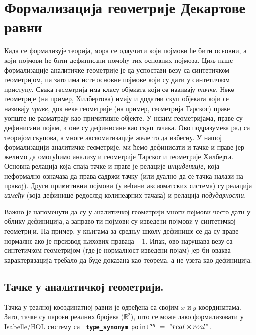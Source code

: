 \section{Формализација геометрије Декартове равни}
\label{sec:cartesian}

Када се формализује теорија, мора се одлучити који појмови ће бити
осно\-вни, а који појмови ће бити дефинисани помоћу тих основних
појмова. Циљ наше формализације аналитичке геометрије је да успостави
везу са си\-нте\-ти\-чком геометријом, па зато има исте основне
појмове који су дати у си\-нте\-ти\-чком приступу. Свака геометрија
има класу објеката који се називају \emph{тачке}. Неке геометрије (на
пример, Хилбертова) имају и додатни скуп објеката који се називају
\emph{праве}, док неке геометрије (на пример, геометрија Тарског)
праве уопште не разматрају као примитивне објекте.  У неким
геометријама, праве су дефинисани појам, и оне су дефинисане као скуп
тачака.  Ово подразумева рад са теоријом скупова, а многе
аксиоматизације желе то да избегну.  У нашој формализацији
ана\-ли\-ти\-чке геометрије, ми ћемо дефинисати и тачке и праве јер
желимо да омогућимо анализу и геометрије Тарског и геометрије
Хилберта. Основна релација која спаја тачке и праве је релације
\emph{инциденције}, која неформално означава да права садржи тачку
(или дуално да се тачка налази на правoj). Други примитивни појмови (у
већини аксиоматских система) су релација \emph{изме\-ђу} (која дефинише
редослед колинеарних тачака) и релација \emph{подударности}.

Важно је напоменути да су у аналитичкој геометрији многи појмови често
дати у облику дефиниција, а заправо ти појмови су изведени појмови у
си\-нте\-ти\-чкој геометрији. На пример, у књигама за средњу школу
дефинише се да су праве нормалне ако је производ њихових праваца
$-1$. Ипак, ово нарушава везу са синтетичком геометријом (где је
нормалност изведени појам) јер би оваква карактеризација требало да
буде доказана као теорема, а не узета као дефиниција.

\subsection{Тачке у аналитичкој геометрији.}
Тачка у реалној координатној равни је одређена са својим $x$ и $y$
координатама. Зато, тачке су парови реалних бројева ($\mathbb{R}^2$),
што се може лако формализовати у Isabelle/HOL систему са {\tt
  \textbf{type\_synonym}\ point$^{ag}\ =\ "real \times real"$}.

